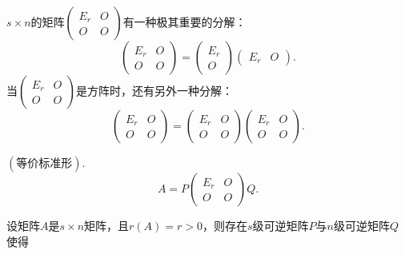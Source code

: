 \documentclass{article}
\begin{document}
\vspace{1ex}
 $s \times n$的矩阵$\left(\begin{array}{cc}
            E_r & O \\
            O   & O
        \end{array}\right)$有一种极其重要的分解：
\begin{equation*}
    \left(
    \begin{array}{cc}
        E_r & O \\
        O   & O
    \end{array}
    \right)
    =
    \left(
    \begin{array}{c}
        E_r \\
        O
    \end{array}
    \right)
    \left(
    \begin{array}{cc}
        E_r & O
    \end{array}
    \right).
\end{equation*}
当$\left(
    \begin{array}{cc}
            E_r & O \\
            O   & O
        \end{array}
    \right)$是方阵时，还有另外一种分解：
\begin{equation*}
    \left(
    \begin{array}{cc}
        E_r & O \\
        O   & O
    \end{array}
    \right)
    =
    \left(
    \begin{array}{cc}
        E_r & O \\
        O   & O
    \end{array}
    \right)
    \left(
    \begin{array}{cc}
        E_r & O \\
        O   & O
    \end{array}
    \right).
\end{equation*}

 $\left(\text{等价标准形}\right)$. 
\begin{equation*}
    A = P \left(
    \begin{array}{cc}
        E_r & O \\
        O   & O
    \end{array}
    \right)Q.
\end{equation*}

 

 设矩阵$A$是$s \times n$矩阵，且$r \left(A\right) = r > 0$，则存在$s$级可逆矩阵$P$与$n$级可逆矩阵$Q$使得
\end{document}
